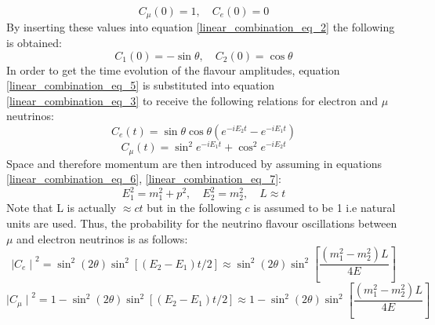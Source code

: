 \begin{equation}
    C_\mu(0) = 1, \quad C_e(0) = 0
    \label{linear_combination_eq_4}
\end{equation}
By inserting these values into equation \ref{linear_combination_eq_2} the following is obtained:
\begin{equation}
    C_1(0) = -\sin\theta, \quad C_2(0) = \cos\theta
    \label{linear_combination_eq_5}
\end{equation}
In order to get the time evolution of the flavour amplitudes, equation \ref{linear_combination_eq_5} is substituted into equation \ref{linear_combination_eq_3} to receive the following relations for electron and $\mu$ neutrinos: 
\begin{equation}
    C_e(t)=\sin\theta\cos\theta(e^{-iE_2t}-e^{-iE_1t})
    \label{linear_combination_eq_6}
\end{equation}
\begin{equation}
    C_\mu(t)=\sin^{2}e^{-iE_1t} + \cos^{2}e^{-iE_2t}
    \label{linear_combination_eq_7}
\end{equation}
Space and therefore momentum are then introduced by assuming in equations \ref{linear_combination_eq_6}, \ref{linear_combination_eq_7}: 
\begin{equation}
   E_1^2=m_1^2 + p^2, \quad E_2^2=m_2^2  , \quad L \approx t
    \label{linear_combination_eq_8}
\end{equation}
Note that L is actually $\approx ct$ but in the following $c$ is assumed to be 1 i.e natural units are used. Thus, the probability for the neutrino flavour oscillations between $\mu$ and electron neutrinos is as follows: 
\begin{equation}
   {\mid{C_e}\mid}^2 = \sin^2(2\theta)\sin^2[(E_2-E_1)t/2] \approx \sin^2(2\theta)\sin^2\left[\frac{(m_1^2-m_2^2)L}{4E}\right]
    \label{linear_combination_eq_9}
\end{equation}
\begin{equation}
    {\mid{C_\mu}\mid}^2 = 1 - \sin^2(2\theta)\sin^2[(E_2-E_1)t/2] \approx 1 - \sin^2(2\theta)\sin^2\left[\frac{(m_1^2-m_2^2)L}{4E}\right]
    \label{linear_combination_eq_10}
\end{equation}
